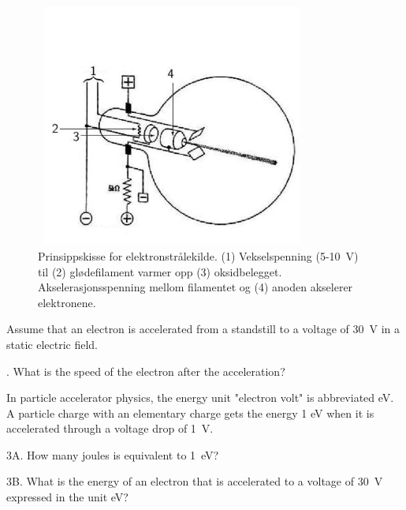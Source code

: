 \documentclass[../Elmag-labhefte-2020.tex]{subfiles}
\begin{document}
\begin{figure}[!h]
    \vspace{-2cm}
    \centering
    \includegraphics[width=9cm,height=8cm,keepaspectratio]{fig/LorentzFig1_resized.pdf}
    \caption{%
        Prinsippskisse for elektronstrålekilde. 
        (1) Vekselspenning (5-\SI{10}{\volt}) til 
        (2) glødefilament varmer opp 
        (3) oksidbelegget. 
        Akselerasjonsspenning mellom filamentet og 
        (4) anoden akselerer elektronene.
    }
    \label{lorentz.fig1}
\end{figure}

Assume that an electron is accelerated from a standstill to a voltage of \SI{30}{\volt} in a static electric field.

{. What is the speed of the electron after the acceleration? }

In particle accelerator physics, the energy unit "electron volt" is abbreviated \si{\eV}. A particle charge with an elementary charge gets the energy 1 eV when it is accelerated through a voltage drop of \SI{1}{\volt}.

{\itsf 3A. How many joules is equivalent to \SI{1}{\eV}? }

{\itsf 3B. What is the energy of an electron that is accelerated to a voltage of \SI{30}{\volt} expressed in the unit \si{\eV}?}
 
\end{document}
